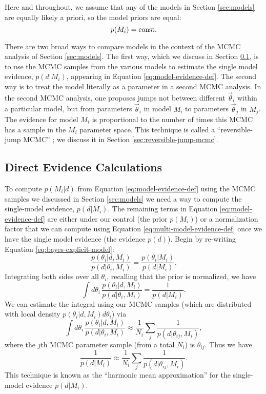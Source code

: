 \documentclass[preprint]{aastex}
\newcommand{\vtheta}{\vec{\theta}}
\begin{document}
Here and throughout, we assume that any of the models in Section
\ref{sec:models} are equally likely a priori, so the model priors are
equal:
\begin{equation}
  p(M_i) = \textnormal{const}.
\end{equation}

There are two broad ways to compare models in the context of the MCMC
analysis of Section \ref{sec:models}.  The first way, which we discuss
in Section \ref{sec:direct-evidence}, is to use the MCMC samples
from the various models to estimate the single model evidence,
$p(d|M_i)$, appearing in Equation \eqref{eq:model-evidence-def}.  The
second way is to treat the model literally as a parameter in a second
MCMC analysis.  In the second MCMC analysis, one proposes jumps not
between different $\vtheta_i$ within a particular model, but from
parameters $\vtheta_i$ in model $M_i$ to parameters $\vtheta_j$ in
$M_j$.  The evidence for model $M_i$ is proportional to the number of
times this MCMC has a sample in the $M_i$ parameter space.  This
technique is called a ``reversible-jump MCMC'' \citep{Green1995}; we
discuss it in Section \ref{sec:reversible-jump-mcmc}.

\subsection{Direct Evidence Calculations}
\label{sec:direct-evidence}

To compute $p(M_i|d)$ from Equation \eqref{eq:model-evidence-def}
using the MCMC samples we discussed in Section \ref{sec:models} we
need a way to compute the single-model evidence, $p(d|M_i)$.  The
remaining terms in Equation \eqref{eq:model-evidence-def} are either
under our control (the prior $p(M_i)$) or a normalization factor that
we can compute using Equation \eqref{eq:multi-model-evidence-def} once
we have the single model evidence (the evidence $p(d)$).  Begin by
re-writing Equation \eqref{eq:bayes-explicit-model}:
\begin{equation}
  \frac{p(\theta_i|d,M_i)}{p(d|\theta_i,M_i)} = \frac{p(\theta_i|M_i)}{p(d|M_i)}.
\end{equation}
Integrating both sides over all $\theta_i$, recalling that the prior
is normalized, we have 
\begin{equation}
  \int d\theta_i\, \frac{p(\theta_i|d,M_i)}{p(d|\theta_i,M_i)} = \frac{1}{p(d|M_i)}.
\end{equation}
We can estimate the integral using our MCMC samples (which are
distributed with local density $p(\theta_i|d,M_i)d\theta_i$) via
\begin{equation}
  \int d\theta_i\, \frac{p(\theta_i|d,M_i)}{p(d|\theta_i,M_i)} \approx
  \frac{1}{N_i} \sum_j \frac{1}{p(d|\theta_{ij}, M_i)},
\end{equation}
where the $j$th MCMC parameter sample (from a total $N_i$) is
$\theta_{ij}$.  Thus we have
\begin{equation}
  \frac{1}{p(d|M_i)} \approx \frac{1}{N_i} \sum_j \frac{1}{p(d|\theta_{ij}, M_i)}.
\end{equation}
This technique is known as the ``harmonic mean approximation'' for the
single-model evidence $p(d|M_i)$.
\end{document}
